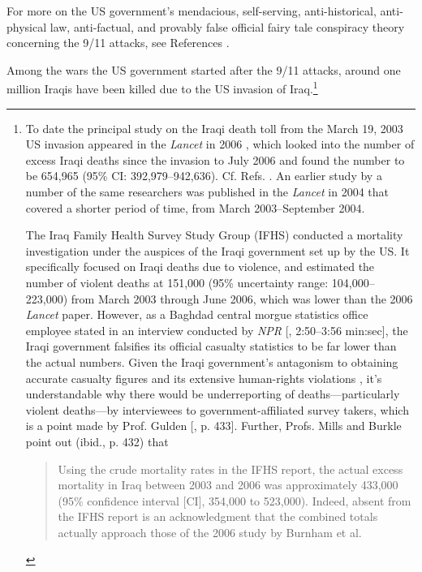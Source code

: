 \documentclass[letterpaper,12pt]{article}
\begin{document}
For more on the US government's mendacious, self-serving, anti-historical, anti-physical law, anti-factual, and provably false official fairy tale conspiracy theory concerning the 9/11 attacks, see References .

Among the wars the US government started after the 9/11 attacks, around one million Iraqis have been killed due to the US invasion of Iraq.\footnote{To date the principal study on the Iraqi death toll from the March 19, 2003 US invasion appeared in the \emph{Lancet} in 2006 \cite{BurnhamEtAl2006-10-21}, which looked into the number of excess Iraqi deaths since the invasion to July 2006 and found the number to be 654,965 (95\% CI: 392,979--942,636). Cf. Refs. . An earlier study by a number of the same researchers was published in the \emph{Lancet} in 2004 \cite{RobertsEtAl2004-9-20} that covered a shorter period of time, from March 2003--September 2004.\par
    The Iraq Family Health Survey Study Group (IFHS) conducted a mortality investigation \cite{AlkhuzaiEtAl2008-1-31} under the auspices of the Iraqi government set up by the US. It specifically focused on Iraqi deaths due to violence, and estimated the number of violent deaths at 151,000 (95\% uncertainty range: 104,000--223,000) from March 2003 through June 2006, which was lower than the 2006 \emph{Lancet} paper. However, as a Baghdad central morgue statistics office employee stated in an interview conducted by \emph{NPR} [, 2:50--3:56 min:sec], the Iraqi government falsifies its official casualty statistics to be far lower than the actual numbers. Given the Iraqi government's antagonism to obtaining accurate casualty figures and its extensive human-rights violations \cite{CNN2011-8-8,UNAMI-OHCHR-2011}, it's understandable why there would be underreporting of deaths---particularly violent deaths---by interviewees to government-affiliated survey takers, which is a point made by Prof. Gulden [, p. 433]. Further, Profs. Mills and Burkle point out (ibid., p. 432) that\begin{quote}
Using the crude mortality rates in the IFHS report, the actual excess mortality in Iraq between 2003 and 2006 was approximately 433,000 (95\% confidence interval [CI], 354,000 to 523,000). Indeed, absent from the IFHS report is an acknowledgment that the combined totals actually approach those of the 2006 study by Burnham et al.

\end{quote}}
\end{document}
